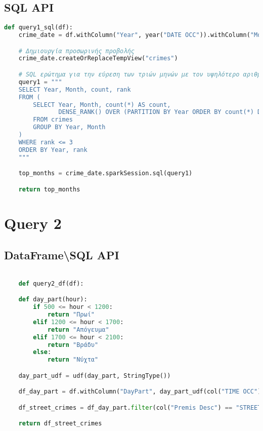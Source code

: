 \documentclass{article}
\begin{document}
\subsection*{SQL API}

\begin{lstlisting}[language = Python]
    def query1_sql(df):
    crime_date = df.withColumn("Year", year("DATE OCC")).withColumn("Month", month("DATE OCC"))

    # Δημιουργία προσωρινής προβολής
    crime_date.createOrReplaceTempView("crimes")

    # SQL ερώτημα για την εύρεση των τριών μηνών με τον υψηλότερο αριθμό εγκλημάτων ανά έτος
    query1 = """
    SELECT Year, Month, count, rank 
    FROM (
        SELECT Year, Month, count(*) AS count, 
               DENSE_RANK() OVER (PARTITION BY Year ORDER BY count(*) DESC) AS rank
        FROM crimes
        GROUP BY Year, Month
    ) 
    WHERE rank <= 3
    ORDER BY Year, rank
    """

    top_months = crime_date.sparkSession.sql(query1)

    return top_months

\end{lstlisting}  


\section*{Query 2}

\subsection*{DataFrame\textbackslash SQL  API}

\begin{lstlisting}[language = Python]

    def query2_df(df):

    def day_part(hour):
        if 500 <= hour < 1200:
            return "Πρωί"
        elif 1200 <= hour < 1700:
            return "Απόγευμα"
        elif 1700 <= hour < 2100:
            return "Βράδυ"
        else:
            return "Νύχτα"

    day_part_udf = udf(day_part, StringType())

    df_day_part = df.withColumn("DayPart", day_part_udf(col("TIME OCC")))

    df_street_crimes = df_day_part.filter(col("Premis Desc") == "STREET").groupBy("DayPart").count().orderBy(col("count").desc())

    return df_street_crimes
\end{lstlisting}
\end{document}

